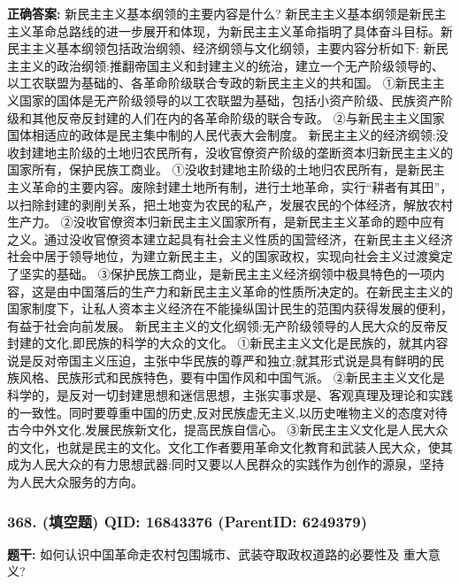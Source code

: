 \documentclass[12pt,UTF8]{ctexart}
\begin{document}
\textbf{正确答案:}
新民主主义基本纲领的主要内容是什么?
新民主主义基本纲领是新民主主义革命总路线的进一步展开和体现，为新民主主义革命指明了具体奋斗目标。新民主主义基本纲领包括政治纲领、经济纲领与文化纲领，主要内容分析如下:
新民主主义的政治纲领:推翻帝国主义和封建主义的统治，建立一个无产阶级领导的、以工农联盟为基础的、各革命阶级联合专政的新民主主义的共和国。
①新民主主义国家的国体是无产阶级领导的以工农联盟为基础，包括小资产阶级、民族资产阶级和其他反帝反封建的人们在内的各革命阶级的联合专政。
②与新民主主义国家国体相适应的政体是民主集中制的人民代表大会制度。
新民主主义的经济纲领:没收封建地主阶级的土地归农民所有，没收官僚资产阶级的垄断资本归新民主主义的国家所有，保护民族工商业。
①没收封建地主阶级的土地归农民所有，是新民主主义革命的主要内容。废除封建土地所有制，进行土地革命，实行“耕者有其田”，以扫除封建的剥削关系，把土地变为农民的私产，发展农民的个体经济，解放农村生产力。
②没收官僚资本归新民主主义国家所有，是新民主主义革命的题中应有之义。通过没收官僚资本建立起具有社会主义性质的国营经济，在新民主主义经济社会中居于领导地位，为建立新民主主，义的国家政权，实现向社会主义过渡奠定了坚实的基础。
③保护民族工商业，是新民主主义经济纲领中极具特色的一项内容，这是由中国落后的生产力和新民主主义革命的性质所决定的。在新民主主义的国家制度下，让私人资本主义经济在不能操纵国计民生的范围内获得发展的便利，有益于社会向前发展。
新民主主义的文化纲领:无产阶级领导的人民大众的反帝反封建的文化,即民族的科学的大众的文化。
①新民主主义文化是民族的，就其内容说是反对帝国主义压迫，主张中华民族的尊严和独立;就其形式说是具有鲜明的民族风格、民族形式和民族特色，要有中国作风和中国气派。
②新民主主义文化是科学的，是反对一切封建思想和迷信思想，主张实事求是、客观真理及理论和实践的一致性。同时要尊重中国的历史,反对民族虚无主义,以历史唯物主义的态度对待古今中外文化,发展民族新文化，提高民族自信心。
③新民主主义文化是人民大众的文化，也就是民主的文化。文化工作者要用革命文化教育和武装人民大众，使其成为人民大众的有力思想武器:同时又要以人民群众的实践作为创作的源泉，坚持为人民大众服务的方向。

\vspace{0.3em}\hrulefill\vspace{0.7em}

\subsubsection*{368. (填空题) \small QID: 16843376 (ParentID: 6249379)}

\textbf{题干:}
如何认识中国革命走农村包围城市、武装夺取政权道路的必要性及 重大意义?
\end{document}
